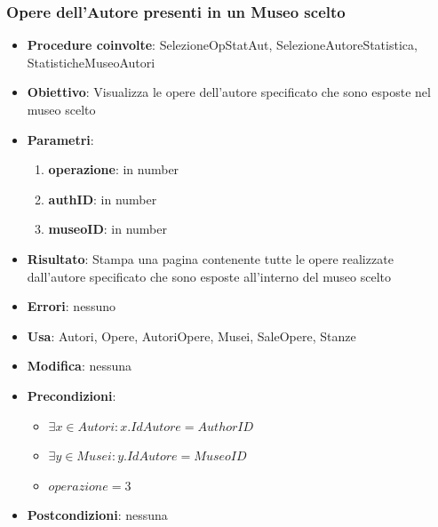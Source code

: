 \subsubsection{Opere dell’Autore presenti in un Museo scelto}
\begin{itemize}
	\item \textbf{Procedure coinvolte}: SelezioneOpStatAut, SelezioneAutoreStatistica, 
	StatisticheMuseoAutori
	\item \textbf{Obiettivo}: Visualizza le opere dell'autore specificato che sono esposte 
	nel museo scelto
	\item \textbf{Parametri}:
	\begin{enumerate}
		\item \textbf{operazione}: in number
		\item \textbf{authID}: in number
		\item \textbf{museoID}: in number
	\end{enumerate}
	\item \textbf{Risultato}: Stampa una pagina contenente tutte le opere realizzate dall'autore specificato che sono esposte all'interno del museo scelto
	\item \textbf{Errori}: nessuno
	\item \textbf{Usa}: Autori, Opere, AutoriOpere, Musei, SaleOpere, Stanze
	\item \textbf{Modifica}: nessuna
	\item \textbf{Precondizioni}:
	\begin{itemize}
		\item $\exists x \in Autori : x.IdAutore = AuthorID$
		\item $\exists y \in Musei : y.IdAutore = MuseoID$
		\item $operazione  = 3$
	\end{itemize}
	\item \textbf{Postcondizioni}: nessuna
\end{itemize}

